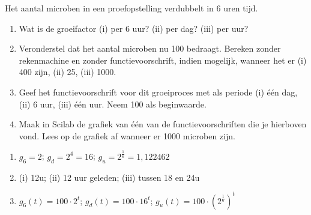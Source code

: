 \begin{oef}
 
    
        Het aantal microben in een proefopstelling verdubbelt in 6
     uren tijd.
     \begin{enumerate}
         \item  Wat is de groeifactor (i) per 6 uur? (ii) per dag? (iii) per uur?

         \item  Veronderstel dat het aantal microben nu 100 bedraagt. Bereken zonder rekenmachine en zonder functievoorschrift, indien mogelijk, wanneer het er (i) 400 zijn, (ii) 25,  (iii) 1000.

         \item  Geef het functievoorschrift voor dit groeiproces met als periode
          (i) \'e\'en dag, (ii)  6 uur, (iii) \'{e}\'{e}n uur. Neem 100 als beginwaarde.
          
          \item Maak in Scilab de grafiek van \'e\'en van de functievoorschriften die je hierboven vond. Lees op de grafiek af wanneer er 1000 microben zijn.
     \end{enumerate}
     \begin{opl}
     \begin{enumerate}
     \item $g_6=2$; $g_d=2^4=16$; $g_u=2^\frac{1}{6}=1,122462$
     \item (i) 12u; (ii) 12 uur geleden; (iii) tussen 18 en 24u
     \item $g_6(t)=100\cdot 2^t$; $g_d(t)=100\cdot 16^t$; $g_u(t)=100\cdot \left(2^\frac16 \right)^t$
     \end{enumerate}
     \end{opl}

      \end{oef}

